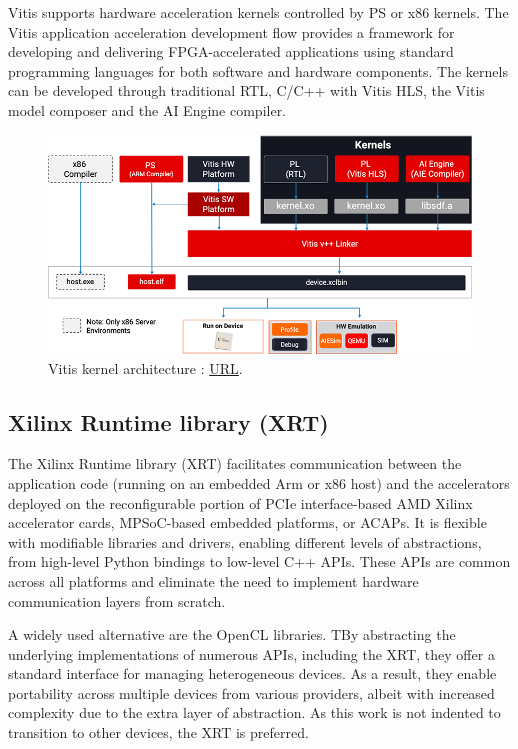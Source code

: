 Vitis supports hardware acceleration kernels controlled by PS or x86 kernels. The Vitis application acceleration development flow provides a framework for developing and delivering FPGA-accelerated applications using standard programming languages for both software and hardware components. The kernels can be developed through traditional RTL, C/C++ with Vitis HLS, the Vitis model composer and the AI Engine compiler.
\begin{figure}[H]
    \centering
        \includegraphics[width=1\textwidth]{Images/Platform/vitis_kernel.png}
        \decoRule
        \caption[Vitis]{Vitis kernel architecture \cite{Vitis_unified_software_platform}: \href{https://www.xilinx.com/products/design-tools/vitis/vitis-platform.html\#development}{URL}.}
        \label{fig:Vitis_kernel_overview}
\end{figure}

\subsection{Xilinx Runtime library (XRT)}
The Xilinx Runtime library\cite{Xilinx_Runtime_Library} (XRT) facilitates communication between the application code (running on an embedded Arm or x86 host) and the accelerators deployed on the reconfigurable portion of PCIe interface-based AMD Xilinx accelerator cards, MPSoC-based embedded platforms, or ACAPs. It is flexible with modifiable libraries and drivers, enabling different levels of abstractions, from high-level Python bindings to low-level C++ APIs. These APIs are common across all platforms and eliminate the need to implement hardware communication layers from scratch. %

A widely used alternative are the OpenCL libraries. TBy abstracting the underlying implementations of numerous APIs, including the XRT, they offer a standard interface for managing heterogeneous devices. As a result, they enable portability across multiple devices from various providers, albeit with increased complexity due to the extra layer of abstraction. As this work is not indented to transition to other devices, the XRT is preferred. %

